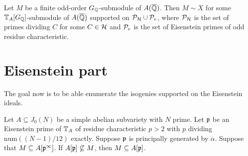 \documentclass[thesis.tex]{subfiles}
\begin{document}
\begin{corollary}
    Let $M$ be a finite odd-order $G_\QQ$-submodule of $A(\QQbar)$. Then $M\sim
    X$ for some $\TT_A[G_\QQ]$-submodule of $A(\QQbar)$ supported on $\P_\H\cup
    \P_e$, where $\P_\H$ is the set of primes dividing $C$ for some $C\in \H$
    and $\P_e$ is the set of Eisenstein primes of odd residue characteristic.
\end{corollary}

\section{Eisenstein part}%
\label{sec:eisenstein_part}

The goal now is to be able enumerate the isogenies supported on the Eisenstein
ideals.

\begin{proposition}{{\cite[Prop. 4.5]{klosin-papikian:ribet}}}%
    \label{prop:eisenstein_cyclic}
    Let $A\subseteq J_0(N)$ be a simple abelian subvariety with $N$ prime. Let
    $\p$ be an Eisenstein prime of $\TT_A$ of residue characteristic $p>2$ with
    $p$ dividing $\mathrm{num}((N-1)/12)$ exactly. Suppose $\p$ is principally
    generated by $\alpha$. Suppose that $M\subseteq A[\p^\infty]$.
    If $A[\p]\not\subseteq M$, then $M\subseteq A[\p]$.
\end{proposition}
\end{document}
